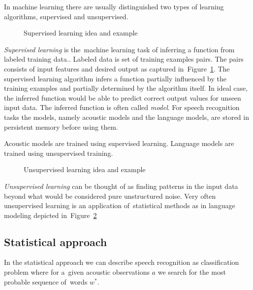 In machine learning there are usually distinguished two types of learning algorithms, supervised and unsupervised.

\begin{figure}[!htp]
    \begin{center}
    
    
    \caption{Supervised learning idea and example}
    \label{fig:supervised} 
    \end{center}
\end{figure}
{\it Supervised learning}\/ is the~machine learning task of inferring a function from labeled training data.\cite{mohri2012foundations}. Labeled data is set of training examples pairs. The pairs consists of input features and desired output as captured in~Figure~\ref{fig:supervised}. The supervised learning algorithm infers a function partially influenced by the training examples and partially determined by the algorithm itself. In ideal case, the inferred function would be able to predict correct output values for unseen input data. 
The inferred function is often called {\it model}. For speech recognition tasks the models, namely acoustic models and the language models, are stored in persistent memory before using them. 

Acoustic models are trained using supervised learning. Language models are trained using unsupervised training. 

\begin{figure}[!htp]
    \begin{center}
    
    
    \caption{Unsupervised learning idea and example}
    \label{fig:unsupervised} 
    \end{center}
\end{figure}
{\it Unsupervised learning}\/ can be thought of as finding patterns in the input data beyond what would be considered 
pure unstructured noise\cite{ghahramani2004unsupervised}. Very often unsupervised learning is an application 
of~statistical methods as in language modeling depicted in~Figure~\ref{fig:unsupervised}

\subsection*{Statistical approach}
\label{sub:statistical_approach}
In the statistical approach we can describe speech recognition as classification problem where 
for a~given acoustic observations $a$ we search for the most probable sequence of~words $w^*$.

